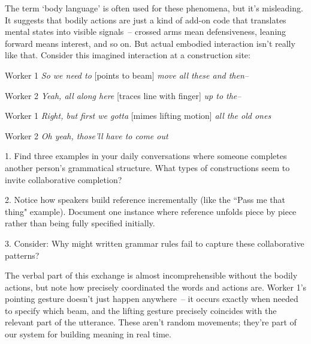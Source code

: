 The term `body language' is often used for these phenomena, but it's misleading. It suggests that bodily actions are just a kind of add-on code that translates mental states into visible signals~-- crossed arms mean defensiveness, leaning forward means interest, and so on. But actual embodied interaction isn't really like that. Consider this imagined interaction at a construction site:

\ea
\begin{dialogue}
\item[Worker 1] \textit{So we need to }[points to beam]\textit{ move all these and then--} 
\item[Worker 2] \textit{Yeah, all along here }[traces line with finger]\textit{ up to the--}
\item[Worker 1] \textit{Right, but first we gotta }[mimes lifting motion]\textit{ all the old ones}
\item[Worker 2] \textit{Oh yeah, those'll have to come out}
\end{dialogue}
\z

\begin{tcolorbox}[title=Exercise: Grammar as Real-Time Resource, colback=white, colframe=green!75!black, fonttitle=\bfseries]
1. Find three examples in your daily conversations where someone completes another person's grammatical structure. What types of constructions seem to invite collaborative completion?

2. Notice how speakers build reference incrementally (like the ``Pass me that thing" example). Document one instance where reference unfolds piece by piece rather than being fully specified initially.

3. Consider: Why might written grammar rules fail to capture these collaborative patterns?
\end{tcolorbox}

\noindent The verbal part of this exchange is almost incomprehensible without the bodily actions, but note how precisely coordinated the words and actions are. Worker 1's pointing gesture doesn't just happen anywhere~-- it occurs exactly when needed to specify which beam, and the lifting gesture precisely coincides with the relevant part of the utterance. These aren't random movements; they're part of our system for building meaning in real time.


